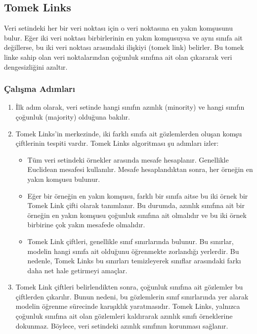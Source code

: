 \newpage

\subsection{Tomek Links}
Veri setindeki her bir veri noktası için o veri noktasına en yakın komşusunu bulur. Eğer iki veri noktası birbirlerinin en yakın komşusuysa ve aynı sınıfa ait değillerse, bu iki veri noktası arasındaki ilişkiyi (tomek link) belirler. Bu tomek linke sahip olan veri noktalarından çoğunluk sınıfına ait olan çıkararak veri dengesizliğini azaltır.

\subsubsection{Çalışma Adımları}

\begin{enumerate}
    \item İlk adım olarak, veri setinde hangi sınıfın azınlık (minority) ve hangi sınıfın çoğunluk (majority) olduğuna bakılır.
    \item Tomek Links’in merkezinde, iki farklı sınıfa ait gözlemlerden oluşan komşu çiftlerinin tespiti vardır. Tomek Links algoritması şu adımları izler:
    \begin{itemize}
        \item Tüm veri setindeki örnekler arasında mesafe hesaplanır. Genellikle Euclidean mesafesi kullanılır. Mesafe hesaplandıktan sonra, her örneğin en yakın komşusu bulunur.
        \item Eğer bir örneğin en yakın komşusu, farklı bir sınıfa aitse bu iki örnek bir Tomek Link çifti olarak tanımlanır. Bu durumda, azınlık sınıfına ait bir örneğin en yakın komşusu çoğunluk sınıfına ait olmalıdır ve bu iki örnek birbirine çok yakın mesafede olmalıdır.
        \item Tomek Link çiftleri, genellikle sınıf sınırlarında bulunur. Bu sınırlar, modelin hangi sınıfa ait olduğunu öğrenmekte zorlandığı yerlerdir. Bu nedenle, Tomek Links bu sınırları temizleyerek sınıflar arasındaki farkı daha net hale getirmeyi amaçlar.
    \end{itemize}
    \item Tomek Link çiftleri belirlendikten sonra, çoğunluk sınıfına ait gözlemler bu çiftlerden çıkarılır. Bunun nedeni, bu gözlemlerin sınıf sınırlarında yer alarak modelin öğrenme sürecinde karışıklık yaratmasıdır. Tomek Links, yalnızca çoğunluk sınıfına ait olan gözlemleri kaldırarak azınlık sınıfı örneklerine dokunmaz. Böylece, veri setindeki azınlık sınıfının korunması sağlanır.
\end{enumerate}

